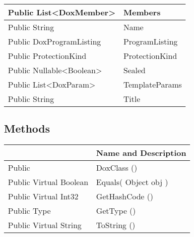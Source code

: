 \documentclass[11pt, oneside, a4paper]{book}
\begin{document}
\begin{center}
\begin{tabular}{| p{3cm} | p{12cm} | }
\hline
 Public  List<DoxMember> &  Members\hypertarget{SoftwareEngineeringTools.{}Documentation.{}DoxClass.{}Members}{}\\
\hline
 Public  String &  Name\hypertarget{SoftwareEngineeringTools.{}Documentation.{}DoxClass.{}Name}{}\\
\hline
 Public  DoxProgramListing &  ProgramListing\hypertarget{SoftwareEngineeringTools.{}Documentation.{}DoxClass.{}ProgramListing}{}\\
\hline
 Public  ProtectionKind &  ProtectionKind\hypertarget{SoftwareEngineeringTools.{}Documentation.{}DoxClass.{}ProtectionKind}{}\\
\hline
 Public  Nullable<Boolean> &  Sealed\hypertarget{SoftwareEngineeringTools.{}Documentation.{}DoxClass.{}Sealed}{}\\
\hline
 Public  List<DoxParam> &  TemplateParams\hypertarget{SoftwareEngineeringTools.{}Documentation.{}DoxClass.{}TemplateParams}{}\\
\hline
 Public  String &  Title\hypertarget{SoftwareEngineeringTools.{}Documentation.{}DoxClass.{}Title}{}\\
\hline
\end{tabular}
\end{center}

\subsection{Methods}
\begin{center}
\begin{tabular}{| p{3cm} | p{12cm} | }
\hline
\textbf{ } & \textbf{ Name and Description}\\
\hline
 Public  &  DoxClass ()\hypertarget{SoftwareEngineeringTools.{}Documentation.{}DoxClass.{}DoxClass}{}\\
\hline
 Public  Virtual  Boolean &  Equals(\hypertarget{SoftwareEngineeringTools.{}Documentation.{}DoxClass.{}Equals\_Object}{} Object  obj  )\\
\hline
 Public  Virtual  Int32 &  GetHashCode ()\hypertarget{SoftwareEngineeringTools.{}Documentation.{}DoxClass.{}GetHashCode}{}\\
\hline
 Public  Type &  GetType ()\hypertarget{SoftwareEngineeringTools.{}Documentation.{}DoxClass.{}GetType}{}\\
\hline
 Public  Virtual  String &  ToString ()\hypertarget{SoftwareEngineeringTools.{}Documentation.{}DoxClass.{}ToString}{}\\
\hline
\end{tabular}
\end{center}
 
\end{document}
